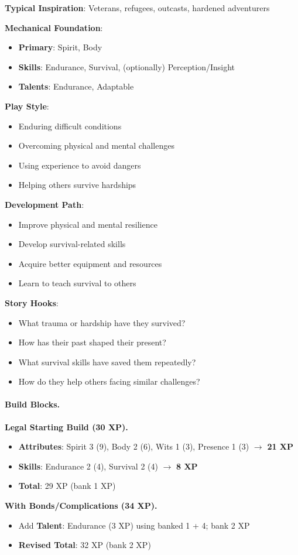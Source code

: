 \begin{multicols}{2}
\textbf{Typical Inspiration}: Veterans, refugees, outcasts, hardened adventurers

\textbf{Mechanical Foundation}:
\begin{itemize}
\item \textbf{Primary}: Spirit, Body
\item \textbf{Skills}: Endurance, Survival, (optionally) Perception/Insight
\item \textbf{Talents}: Endurance, Adaptable
\end{itemize}

\textbf{Play Style}:
\begin{itemize}
\item Enduring difficult conditions
\item Overcoming physical and mental challenges
\item Using experience to avoid dangers
\item Helping others survive hardships
\end{itemize}

\textbf{Development Path}:
\begin{itemize}
\item Improve physical and mental resilience
\item Develop survival-related skills
\item Acquire better equipment and resources
\item Learn to teach survival to others
\end{itemize}

\textbf{Story Hooks}:
\begin{itemize}
\item What trauma or hardship have they survived?
\item How has their past shaped their present?
\item What survival skills have saved them repeatedly?
\item How do they help others facing similar challenges?
\end{itemize}

\paragraph{Build Blocks.}
\textbf{Legal Starting Build (30 XP).}
\begin{itemize}
\item \textbf{Attributes}: Spirit 3 (9), Body 2 (6), Wits 1 (3), Presence 1 (3) $\rightarrow$ \textbf{21 XP}
\item \textbf{Skills}: Endurance 2 (4), Survival 2 (4) $\rightarrow$ \textbf{8 XP}
\item \textbf{Total}: 29 XP (bank 1 XP)
\end{itemize}
\textbf{With Bonds/Complications (34 XP).}
\begin{itemize}
\item Add \textbf{Talent}: Endurance (3 XP) using banked 1 + 4; bank 2 XP
\item \textbf{Revised Total}: 32 XP (bank 2 XP)
\end{itemize}


\end{multicols}
